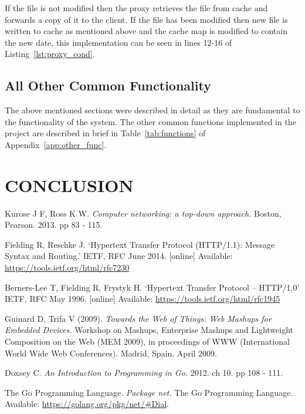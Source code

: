 \documentclass[10pt,twocolumn]{witseiepaper}
\begin{document}
		If the file is not modified then the proxy retrieves the file from cache and forwards a copy of it to the client. If the file has been modified then new file is written to cache as mentioned above and the cache map is modified to contain the new date, this implementation can be seen in lines 12-16 of Listing~\ref{lst:proxy_cond}. 
	
	\subsection{All Other Common Functionality}
	
		The above mentioned sections were described in detail as they are fundamental to the functionality of the system. The other common functions implemented in the project are described in brief in Table~\ref{tab:functions} of Appendix~\ref{app:other_func}.


\section{CONCLUSION}


\begin{thebibliography}{1}

 Kurose J F, Ross K W. \emph{Computer networking: a top-down approach.} Boston, Pearson. 2013. pp 83 - 115.

 Fielding R, Reschke J. `Hypertext Transfer Protocol (HTTP/1.1): Message Syntax and Routing.' IETF, RFC June 2014. [online] Available: \url{https://tools.ietf.org/html/rfc7230}

 Berners-Lee T, Fielding R, Frystyk H. `Hypertext Transfer Protocol -- HTTP/1.0' IETF, RFC May 1996. [online] Available: \url{https://tools.ietf.org/html/rfc1945}

   Guinard D, Trifa V (2009). \emph{Towards the Web of Things: Web Mashups for Embedded Devices.} Workshop on Mashups, Enterprise Mashups and Lightweight Composition on the Web (MEM 2009), in proceedings of WWW (International World Wide Web Conferences). Madrid, Spain. April 2009.  

 Doxsey C. \emph{An Introduction to Programming in Go.} 2012. ch 10. pp 108 - 111.

 The Go Programming Language. \emph{Package net.} The Go Programming Language. Available: \url{https://golang.org/pkg/net/#Dial}.


\end{thebibliography}
\end{document}
